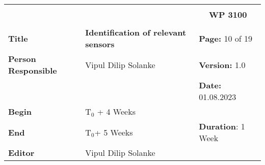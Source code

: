 \begin{table}[!h]
  \begin{center}
    \begin{tabular}{|p{35mm}||p{55mm}|p{50mm}||p{40mm}|}
      \hline
      \multicolumn{3}{|l||}{\textbf{}} & \multicolumn{1}{c|}{}                                                                                                                                                \\
      \multicolumn{3}{|l||}{\textbf{}} & \multicolumn{1}{c|}{\textbf{WP 3100}}                                                                                                                                \\
      \multicolumn{3}{|l||}{\textbf{}} & \multicolumn{1}{c|}{}                                                                                                                                                \\
      \hline\hline
      \textbf{Title}                   & \multicolumn{2}{p{7cm}||}{\textbf{Identification of relevant sensors}}
                                       & \textbf{Page:} 10 of 19                                                                                                                                            \\
      \hline
      \textbf{Person Responsible}        & \multicolumn{2}{l||}{Vipul Dilip Solanke}                                                                                                   & \textbf{Version:} 1.0   \\
      \hline
      \multicolumn{3}{|l||}{}          & \textbf{Date:} 01.08.2023                                                                                                                                          \\
      \hline\hline
      \textbf{Begin}                  & \multicolumn{2}{l||}{T$_0$ + 4 Weeks}                                                                                                                &                         \\
      \hline
      \textbf{End}                    & \multicolumn{2}{l||}{T$_0$+ 5 Weeks}                                                                                                        & \textbf{Duration}: 1 Week \\
      \hline\hline
      \textbf{Editor}              & \multicolumn{3}{l|}{Vipul Dilip Solanke}                                                                                                                              \\

\end{tabular}
\end{center}
\end{table}
